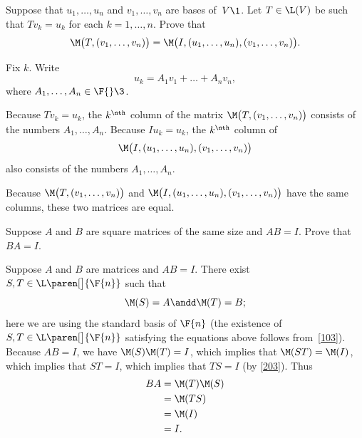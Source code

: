 \exercise
Suppose that $u_1, \dots, u_n$ and $v_1, \dots, v_n$ are bases of~$V\1$.  Let
$T \in \L(V)$ be such that $Tv_k = u_k$ for each
$k = 1, \dots, n$.  Prove that
\[
\M\bigl( T, (v_1, \dots, v_n) \bigr) =
\M\bigl(I, (u_1, \dots, u_n), (v_1, \dots, v_n)\bigr).
\]
\exercisedisplayend

\begin{Solution}
Fix $k$.  Write
\[
u_k = A_1 v_1 + \dots + A_n v_n,
\]
where $A_1, \dots, A_n \in \F{}\3$.

Because $Tv_k = u_k$, the $k^\nth$ column of
the matrix $\M\bigl( T, (v_1, \dots, v_n) \bigr)$ consists of the numbers
$A_1, \dots, A_n$.  Because $Iu_k = u_k$, the $k^\nth$ column of
\[
\M\bigl(I, (u_1, \dots, u_n), (v_1, \dots, v_n)\bigr)
\]
also consists of the numbers $A_1, \dots, A_n$.

Because $\M\bigl( T, (v_1, \dots, v_n) \bigr)$ and
$\M\bigl(I, (u_1, \dots, u_n), (v_1, \dots, v_n)\bigr)$ have the same columns,
these two matrices are equal.
\end{Solution}

\exercise
Suppose $A$ and $B$ are square matrices of the same size and $AB = I$. Prove that $BA = I$.

\begin{Solution}
Suppose $A$ and $B$ are  matrices and $AB = I$. There exist
$S, T \in \L\paren[\big]{\F{n}}$ such that
\[
\M(S) = A \andd \M(T) = B;
\]
here we are using the standard basis of $\F{n}$ (the existence of
$S, T \in \L\paren[\big]{\F{n}}$ satisfying the equations above follows from~\ref{103}).
Because $AB = I$, we have $\M(S) \M(T) = I$, which implies that $\M(ST) = \M(I)$,
which implies that $ST = I$, which implies that $TS = I$ (by \ref{203}).  Thus
\begin{align*}
BA &= \M(T) \M(S) \\
&= \M(TS) \\
&= \M(I) \\
&= I.
\end{align*}
\end{Solution}

